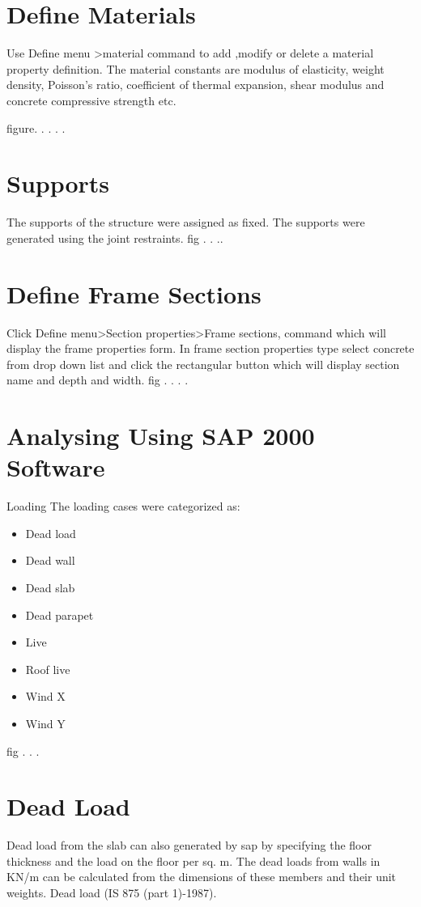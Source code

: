 \section{Define Materials}
Use Define  menu >material command to add ,modify or delete a material property definition. The material constants are modulus of elasticity, weight density, Poisson’s ratio, coefficient of thermal expansion, shear modulus and concrete compressive strength etc.

figure.
.
.
.
.
\section{Supports}
The supports of the structure were assigned as fixed. The supports were generated using the  joint restraints.
fig
.
.
..
\section{Define Frame Sections}
Click Define menu>Section properties>Frame sections, command which will display the frame properties form. In frame section properties type select concrete from drop down list and click the rectangular button which will display section name and depth and width. 
fig
.
.
.
.
\section{Analysing Using SAP 2000 Software}
Loading
The loading cases were categorized as:
\begin{itemize}
\item	Dead load
\item	Dead wall 
\item	Dead slab
\item	Dead parapet
\item	Live
\item	Roof live
\item	Wind X
\item	Wind Y

\end{itemize} 

fig
.
.
.

\section{Dead Load}
Dead load from the slab can also generated by sap by specifying the floor thickness and the load on the floor per sq. m. The dead loads from walls in KN/m can be calculated from the dimensions of these members and their unit weights. Dead load (IS 875 (part 1)-1987).

